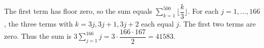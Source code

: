 The first term has floor zero, so the sum equals $\sum_{k=1}^{500}\lfloor\dfrac{k}{3}\rfloor$. For each $j=1,\ldots,166$, the three terms with $k=3j,3j+1,3j+2$ each equal $j$. The first two terms are zero. Thus the sum is $3\sum_{j=1}^{166}j=3\cdot\dfrac{166\cdot167}{2}=\boxed{41583}$.
